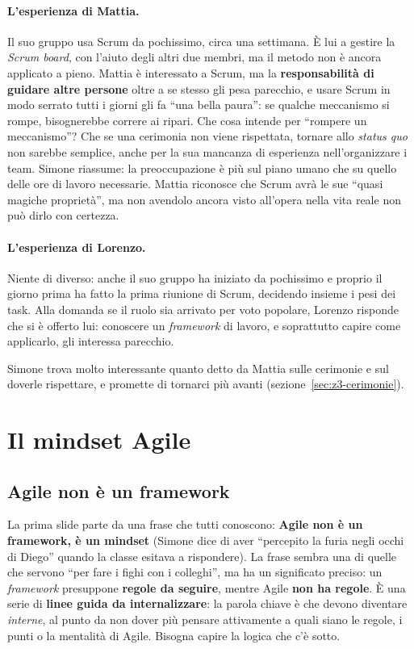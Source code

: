 \paragraph{L'esperienza di Mattia.} Il suo gruppo usa Scrum da pochissimo,
circa una settimana. È lui a gestire la \emph{Scrum board}, con l'aiuto degli
altri due membri, ma il metodo non è ancora applicato a pieno. Mattia è
interessato a Scrum, ma la \textbf{responsabilità di guidare altre persone}
oltre a se stesso gli pesa parecchio, e usare Scrum in modo serrato tutti i
giorni gli fa ``una bella paura'': se qualche meccanismo si rompe,
bisognerebbe correre ai ripari. Che cosa intende per ``rompere un
meccanismo''? Che se una cerimonia non viene rispettata, tornare allo
\emph{status quo} non sarebbe semplice, anche per la sua mancanza di
esperienza nell'organizzare i team. Simone riassume: la preoccupazione è più
sul piano umano che su quello delle ore di lavoro necessarie. Mattia
riconosce che Scrum avrà le sue ``quasi magiche proprietà'', ma non avendolo
ancora visto all'opera nella vita reale non può dirlo con certezza.

\paragraph{L'esperienza di Lorenzo.} Niente di diverso: anche il suo gruppo
ha iniziato da pochissimo e proprio il giorno prima ha fatto la prima
riunione di Scrum, decidendo insieme i pesi dei task. Alla domanda se il
ruolo sia arrivato per voto popolare, Lorenzo risponde che si è offerto lui:
conoscere un \emph{framework} di lavoro, e soprattutto capire come
applicarlo, gli interessa parecchio.

Simone trova molto interessante quanto detto da Mattia sulle cerimonie e sul
doverle rispettare, e promette di tornarci più avanti
(sezione~\ref{sec:z3-cerimonie}).

\section{Il mindset Agile}
\label{sec:z3-mindset}

\subsection{Agile non è un framework}

La prima slide parte da una frase che tutti conoscono: \textbf{Agile non è un
framework, è un mindset} (Simone dice di aver ``percepito la furia negli
occhi di Diego'' quando la classe esitava a rispondere). La frase sembra una
di quelle che servono ``per fare i fighi con i colleghi'', ma ha un
significato preciso: un \emph{framework} presuppone \textbf{regole da
seguire}, mentre Agile \textbf{non ha regole}. È una serie di \textbf{linee
guida da internalizzare}: la parola chiave è che devono diventare
\emph{interne}, al punto da non dover più pensare attivamente a quali siano
le regole, i punti o la mentalità di Agile. Bisogna capire la logica che c'è
sotto.

